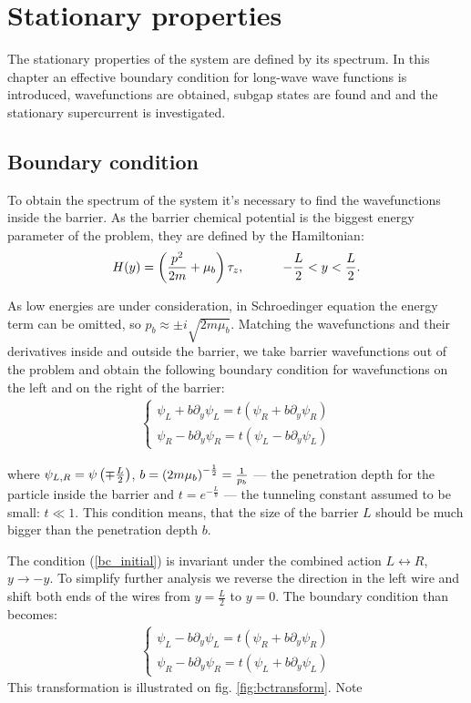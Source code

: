 \chapter{Stationary properties} 
\label{chap:stationary}
\label{chap:stationary_properties}
The stationary properties of the system are defined by its spectrum. In this chapter an effective boundary condition for long-wave wave functions is introduced, wavefunctions are obtained, subgap states are found and  and the stationary supercurrent is investigated.

\section{Boundary condition}

To obtain the spectrum of the system it's necessary to find the wavefunctions inside the barrier. As the barrier chemical potential  is the biggest energy parameter of the problem, they are defined by the Hamiltonian:
\begin{gather}
\label{barrier_Hamiltonian}
	H(y)
	=
	\left(
		\frac{p^2}{2m}
		+\mu_b
	\right)\tau_z,  ~~~~~~~~~-\frac{L}{2}<y<\frac{L}{2}.
\end{gather} 

As low energies are under consideration, in Schroedinger equation the energy term can be omitted, so $ p_b\approx\pm i \sqrt{2m\mu_b} $. Matching the wavefunctions and their derivatives inside and outside the barrier, we take barrier wavefunctions out of the problem and obtain the following boundary condition for wavefunctions on the left and on the right of the barrier:
\begin{gather}
\label{bc_initial}
	\begin{cases}
	\psi_L + b\partial_y\psi_L=t(\psi_R + b\partial_y\psi_R) \\
	\psi_R - b\partial_y\psi_R=t(\psi_L - b\partial_y\psi_L)
	\end{cases}
\end{gather}

where $ \psi_{L,R}=\psi\left(\mp\frac{L}{2}\right) $, $ b=\left({2m\mu_b}\right)^{-\frac{1}{2}}=\frac{1}{p_b} $ --- the penetration depth for the particle inside the barrier and $ t = e^{-\frac{L}{b} }$ --- the tunneling constant assumed to be small: $ t\ll 1 $. This condition means, that the size of the barrier $ L $ should be  much bigger than the penetration depth $ b $.

The condition (\ref{bc_initial}) is invariant under the combined action $ L\leftrightarrow R $, $ y\to-y $. To simplify further analysis we reverse the direction in the left wire and shift both ends of the wires from $ y= \frac{L}{2} $ to $ y=0 $. The boundary condition than becomes:
\begin{gather}
\label{bc_transformed}
\begin{cases}
\psi_L - b\partial_y\psi_L=t(\psi_R + b\partial_y\psi_R) \\
\psi_R - b\partial_y\psi_R=t(\psi_L + b\partial_y\psi_L)
\end{cases}
\end{gather}
This transformation is illustrated on fig. \ref{fig:bctransform}. Note

